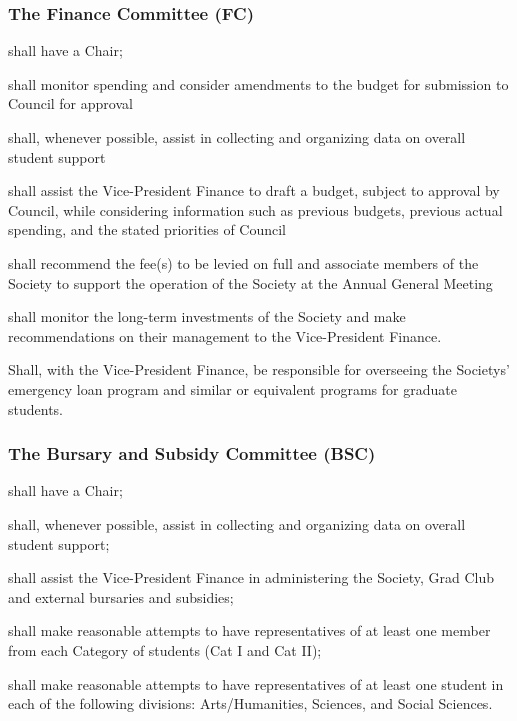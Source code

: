 \subsubsection{The Finance Committee (FC)}
\begin{longenum}[ label*=\thesubsubsection.\arabic*., align=left]
	\item shall have a Chair;
    \item shall monitor spending and consider amendments to the budget for submission to Council for approval
    \item shall, whenever possible, assist in collecting and organizing data on overall student support
    \item shall assist the Vice-President Finance to draft a budget, subject to approval by Council, while considering information such as previous budgets, previous actual spending, and the stated priorities of Council
    \item shall recommend the fee(s) to be levied on full and associate members of the Society to support the operation of the Society at the Annual General Meeting
    \item shall monitor the long-term investments of the Society and make recommendations on their management to the Vice-President Finance.
   \item Shall, with the Vice-President Finance, be responsible for overseeing the Societys' emergency loan program and similar or equivalent programs for graduate students.
\end{longenum}

\subsubsection{The Bursary and Subsidy Committee (BSC)}
\begin{longenum}[ label*=\thesubsubsection.\arabic*., align=left]
	\item shall have a Chair;
    \item shall, whenever possible, assist in collecting and organizing data on overall student support; 
    \item shall assist the Vice-President Finance in administering the Society, Grad Club and external bursaries and subsidies;
    \item shall make reasonable attempts to have representatives of at least one member from each Category of students (Cat I and Cat II);
    \item shall make reasonable attempts to have representatives of at least one student in each of the following divisions: Arts/Humanities, Sciences, and Social Sciences.
\end{longenum}

